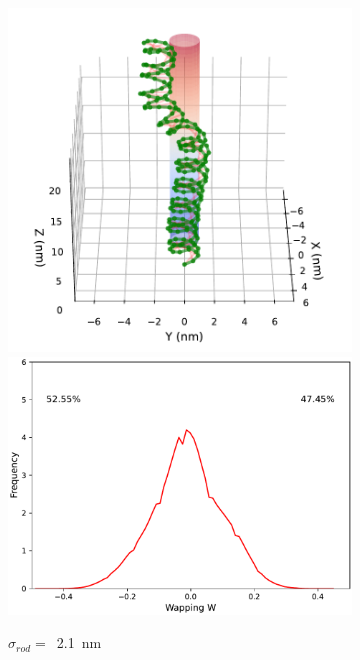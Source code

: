 \documentclass[a4paper,10pt]{article}
\begin{document}
\begin{figure}[tb]
\centering
\begin{subfigure}{.3\textwidth}
\includegraphics[width=\textwidth]{r2_A_2000000_16.pdf}
\includegraphics[width=\textwidth]{r2_A_wr_pr.pdf}
\caption{$\sigma_{rod}=$~\SI{2.1}{\nm}}
\label{fig:r2_a}
\end{subfigure}
\begin{subfigure}{.3\textwidth}

\end{subfigure}
\end{figure}
\end{document}
